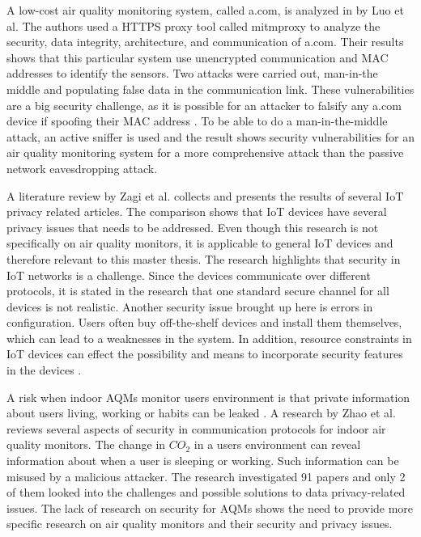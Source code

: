 A low-cost air quality monitoring system, called a.com, is analyzed in \cite{SecurityAndDataIntInAQM} by Luo et al. The authors used a HTTPS proxy tool called mitmproxy to analyze the security, data integrity, architecture, and communication of a.com. Their results shows that this particular system use unencrypted communication and \gls{MAC} addresses to identify the sensors. Two attacks were carried out, man-in-the middle and populating false data in the communication link. These vulnerabilities are a big security challenge, as it is possible for an attacker to falsify any a.com device if spoofing their \gls{MAC} address \cite{SecurityAndDataIntInAQM}. To be able to do a man-in-the-middle attack, an active sniffer is used and the result shows security vulnerabilities for an air quality monitoring system for a more comprehensive attack than the passive network eavesdropping attack. 

A literature review by Zagi et al. \cite{PrivacyOnGeneralIoT} collects and presents the results of several \gls{IoT} privacy related articles. The comparison shows that \gls{IoT} devices have several privacy issues that needs to be addressed. Even though this research is not specifically on air quality monitors, it is applicable to general \gls{IoT} devices and therefore relevant to this master thesis. The research highlights that security in \gls{IoT} networks is a challenge. Since the devices communicate over different protocols, it is stated in the research that one standard secure channel for all devices is not realistic. Another security issue brought up here is errors in configuration. Users often buy off-the-shelf devices and install them themselves, which can lead to a weaknesses in the system. In addition, resource constraints in \gls{IoT} devices can effect the possibility and means to incorporate security features in the devices \cite{PrivacyOnGeneralIoT}. 

A risk when indoor \gls{AQM}s monitor users environment is that private information about users living, working or habits can be leaked \cite{IAQMonitorCommunicationReview}. A research by Zhao et al. \cite{IAQMonitorCommunicationReview} reviews several aspects of security in communication protocols for indoor air quality monitors. The change in \(CO_2\) in a users environment can reveal information about when a user is sleeping or working. Such information can be misused by a malicious attacker. The research investigated 91 papers and only 2 of them looked into the challenges and possible solutions to data privacy-related issues. The lack of research on security for \gls{AQM}s shows the need to provide more specific research on air quality monitors and their security and privacy issues. 


